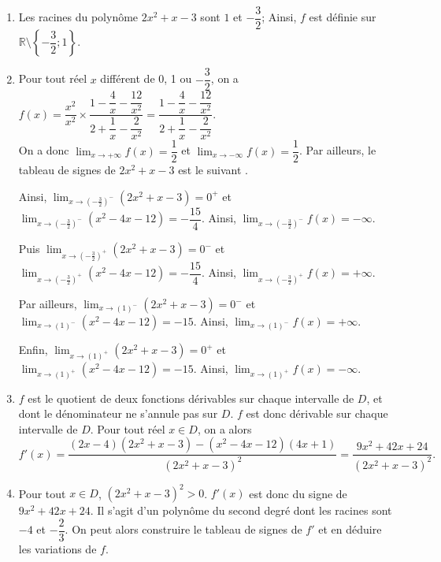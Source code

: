 \documentclass[11pt,fleqn, openany]{book} %
\begin{document}
\begin{solution}\hspace{0pt}
\begin{enumerate}
\item Les racines du polynôme $2x^2+x-3$ sont $1$ et $-\dfrac{3}{2}$; Ainsi, $f$ est définie sur $\mathbb{R}\setminus\left\{-\dfrac{3}{2};1\right\}$.
\item Pour tout réel $x$ différent de 0, 1 ou $-\dfrac{3}{2}$, on a $f(x)=\dfrac{x^2}{x^2} \times \dfrac{1-\dfrac{4}{x}-\dfrac{12}{x^2}}{2+\dfrac{1}{x}-\dfrac{2}{x^2}} = \dfrac{1-\dfrac{4}{x}-\dfrac{12}{x^2}}{2+\dfrac{1}{x}-\dfrac{2}{x^2}}$.\\
On a donc $\displaystyle\lim_{ x\to + \infty}f(x)=\dfrac{1}{2}$ et $\displaystyle\lim_{ x\to - \infty}f(x)=\dfrac{1}{2}$. Par ailleurs, le tableau de signes de $2x^2+x-3$ est le suivant .

\begin{center}
\end{center}

Ainsi, $\displaystyle\lim_{x \to \left(-\frac{3}{2}\right)^-}(2x^2+x-3)=0^+$ et $\displaystyle\lim_{x \to \left(-\frac{3}{2}\right)^-}(x^2-4x-12)=-\dfrac{15}{4}$. Ainsi, $\displaystyle\lim_{x \to \left(-\frac{3}{2}\right)^-}f(x)=-\infty$.

Puis $\displaystyle\lim_{x \to \left(-\frac{3}{2}\right)^+}(2x^2+x-3)=0^-$ et $\displaystyle\lim_{x \to \left(-\frac{3}{2}\right)^+}(x^2-4x-12)=-\dfrac{15}{4}$. Ainsi, $\displaystyle\lim_{x \to \left(-\frac{3}{2}\right)^+}f(x)=+\infty$.

Par ailleurs, $\displaystyle\lim_{x \to \left(1\right)^-}(2x^2+x-3)=0^-$ et $\displaystyle\lim_{x \to \left(1\right)^-}(x^2-4x-12)=-15$. Ainsi, $\displaystyle\lim_{x \to \left(1\right)^-}f(x)=+\infty$.

Enfin, $\displaystyle\lim_{x \to \left(1\right)^+}(2x^2+x-3)=0^+$ et $\displaystyle\lim_{x \to \left(1\right)^+}(x^2-4x-12)=-15$. Ainsi, $\displaystyle\lim_{x \to \left(1\right)^+}f(x)=-\infty$.

\item $f$ est le quotient de deux fonctions dérivables sur chaque intervalle de $D$, et dont le dénominateur ne s'annule pas sur $D$. $f$ est donc dérivable sur chaque intervalle de $D$. Pour tout réel $x\in D$, on a alors
\[f'(x)=\dfrac{(2x-4)(2x^2+x-3)-(x^2-4x-12)(4x+1)}{(2x^2+x-3)^2}=\dfrac{9x^2+42x+24}{(2x^2+x-3)^2}.\]
\item Pour tout $x\in D$, $(2x^2+x-3)^2>0$. $f'(x)$ est donc du signe de $9x^2+42x+24$. Il s'agit d'un polynôme du second degré dont les racines sont $-4$ et $-\dfrac{2}{3}$. On peut alors construire le tableau de signes de $f'$ et en déduire les variations de $f$.


\end{enumerate}
\end{solution}
\end{document}
